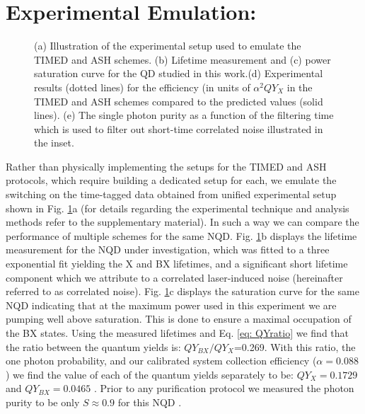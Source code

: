 \documentclass[journal=nalefd,manuscript=letter]{achemso}
\begin{document}
\section{Experimental Emulation:}
\begin{figure}[t]
\caption{(a) Illustration of the experimental setup used to emulate the TIMED and ASH schemes. (b) Lifetime measurement and (c) power saturation curve for the QD studied in this work.(d) Experimental results (dotted lines) for the efficiency (in units of $\alpha^2QY_X$ in the TIMED and ASH schemes compared to the predicted values (solid lines). (e) The single photon purity as a function of the filtering time which is used to filter out short-time correlated noise illustrated in the inset. }
\label{fig:exp1}
\end{figure}
Rather than physically implementing the setups for the TIMED and ASH protocols, which require building a dedicated setup for each, we emulate the switching on the time-tagged data obtained from unified experimental setup shown in Fig. \ref{fig:exp1}a  
(for details regarding the experimental technique and analysis methods refer to the supplementary material). 
In such a way we can compare the performance of multiple schemes for the same NQD. 
Fig. \ref{fig:exp1}b displays the lifetime measurement for the NQD under investigation, which was fitted to a three exponential fit yielding the X and BX lifetimes, and a significant short lifetime component which we attribute to a correlated laser-induced noise (hereinafter referred to as correlated noise). 
Fig. \ref{fig:exp1}c displays the saturation curve for the same NQD indicating that at the maximum power used in this experiment we are pumping well above saturation. This is done to ensure a maximal occupation of the BX states.
Using the measured lifetimes and Eq. \ref{eq: QYratio} we find that the ratio between the quantum yields is: $QY_{BX}/QY_X$=0.269. 
With this ratio, the one photon probability, and our calibrated system collection efficiency ($\alpha = 0.088$) we find the value of each of the quantum yields separately to be: $QY_X=0.1729$ and $QY_{BX}=0.0465$ \cite{supp}. 
Prior to any purification protocol we measured the photon purity to be only $S\approx0.9$ for this NQD \cite{supp}.
 
\end{document}
